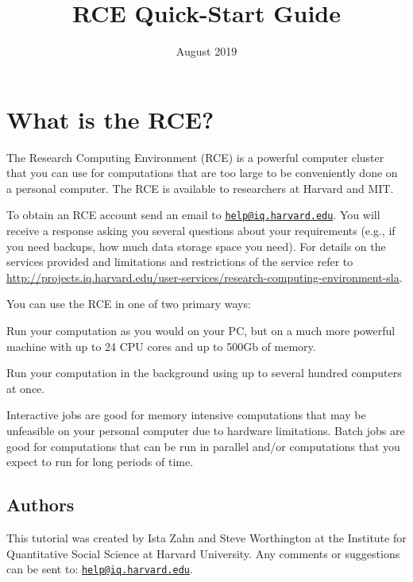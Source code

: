 \documentclass[]{book}
\title{RCE Quick-Start Guide}
\author{}
\date{August 2019}
\providecommand{\tightlist}{%
  \setlength{\itemsep}{0pt}\setlength{\parskip}{0pt}}
\begin{document}
\maketitle

{
\setcounter{tocdepth}{1}
\tableofcontents
}
\chapter*{What is the RCE?}\label{what-is-the-rce}

The Research Computing Environment (RCE) is a powerful computer cluster
that you can use for computations that are too large to be conveniently
done on a personal computer. The RCE is available to researchers at
Harvard and MIT.

To obtain an RCE account send an email to
\href{mailto:help@iq.harvard.edu}{\nolinkurl{help@iq.harvard.edu}}. You
will receive a response asking you several questions about your
requirements (e.g., if you need backups, how much data storage space you
need). For details on the services provided and limitations and
restrictions of the service refer to
\url{http://projects.iq.harvard.edu/user-services/research-computing-environment-sla}.

You can use the RCE in one of two primary ways:

\begin{description}
\tightlist
\item[\textbf{Interactive jobs}]
Run your computation as you would on your PC, but on a much more
powerful machine with up to 24 CPU cores and up to 500Gb of memory.
\item[\textbf{Batch jobs}]
Run your computation in the background using up to several hundred
computers at once.
\end{description}

Interactive jobs are good for memory intensive computations that may be
unfeasible on your personal computer due to hardware limitations. Batch
jobs are good for computations that can be run in parallel and/or
computations that you expect to run for long periods of time.

\section*{Authors}\label{authors}

This tutorial was created by Ista Zahn and Steve Worthington at the
Institute for Quantitative Social Science at Harvard University. Any
comments or suggestions can be sent to:
\href{mailto:help@iq.harvard.edu}{\nolinkurl{help@iq.harvard.edu}}.
\end{document}
